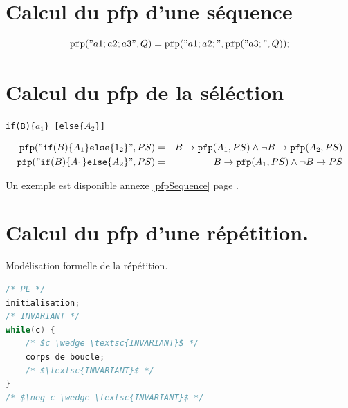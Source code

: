 \documentclass[12pt,a4paper,openany]{book}
\begin{document}
	\section{Calcul du pfp d'une séquence}
	$$\texttt{pfp}("a1;a2;a3", Q) = \texttt{pfp}("a1;a2;", \texttt{pfp}("a3;", Q));$$
	\section{Calcul du pfp de la séléction} \begin{center} \texttt{if(B)\{$a_1$\} [else\{$A_2$\}]}
	 \end{center}
\begin{eqnarray*}
	\texttt{pfp}("\texttt{if}(B)\{A_1\}\texttt{else}\{1_2\}", PS) &=&
	B \rightarrow \texttt{pfp}(A_1, PS) \wedge \neg B \rightarrow \texttt{pfp} (A_2, PS)\\
	\texttt{pfp}("\texttt{if}(B)\{A_1\}\texttt{else}\{A_2\}", PS) &=& B \rightarrow \texttt{pfp}(A_1, PS) \wedge \neg B \rightarrow PS 
\end{eqnarray*}

Un exemple est disponible annexe \ref{pfpSequence} page \pageref{pfpSequence}.

\section{Calcul du pfp d'une répétition.}\label{pfpBoucle}
Modélisation formelle de la répétition.
\begin{lstlisting}[language=C]
/* PE */
initialisation;
/* INVARIANT */
while(c) {
	/* $c \wedge \textsc{INVARIANT}$ */
	corps de boucle;
	/* $\textsc{INVARIANT}$ */
}
/* $\neg c \wedge \textsc{INVARIANT}$ */
\end{lstlisting}
\end{document}
